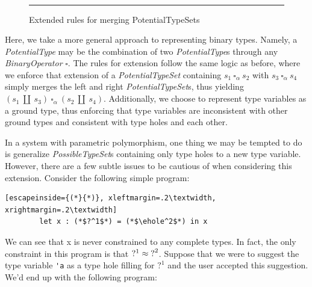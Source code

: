 \begin{figure}[h!]
\[\begin{array}{rcl}
\end{array}\] 
\caption{Extended rules for merging PotentialTypeSets}
\vspace{5px} 
\hrule
\label{fig:extended_merging_possible_type_sets}
\vspace{-5px}
\end{figure}
Here, we take a more general approach to representing binary types. Namely, a \emph{PotentialType} may be the combination of two \emph{PotentialType}s through any \emph{BinaryOperator} $\square$. The rules for extension follow the same logic as before, where we enforce that extension of a \emph{PotentialTypeSet} containing $s_1 ~\square_{\alpha}~ s_2$ with $s_3 ~\square_{\alpha}~ s_4$ simply merges the left and right \emph{PotentialTypeSet}s, thus yielding $(s_1 ~\amalg~ s_3) ~\square_{\alpha}~ (s_2 ~\amalg~ s_4)$. Additionally, we choose to represent type variables as a ground type, thus enforcing that type variables are inconsistent with other ground types and consistent with type holes and each other. 

In a system with parametric polymorphism, one thing we may be tempted to do is generalize \emph{PossibleTypeSet}s containing only type holes to a new type variable. However, there are a few subtle issues to be cautious of when considering this extension. Consider the following simple program:

\begin{center}
    \begin{lstlisting}[escapeinside={(*}{*)}, xleftmargin=.2\textwidth, xrightmargin=.2\textwidth]
        let x : (*$?^1$*) = (*$\ehole^2$*) in x
    \end{lstlisting}
\end{center}

We can see that x is never constrained to any complete types. In fact, the only constraint in this program is that $?^1 \approx \mathtt{?}^2$. Suppose that we were to suggest the type variable \lstinline{'a} as a type hole filling for $?^1$ and the user accepted this suggestion. We'd end up with the following program:


